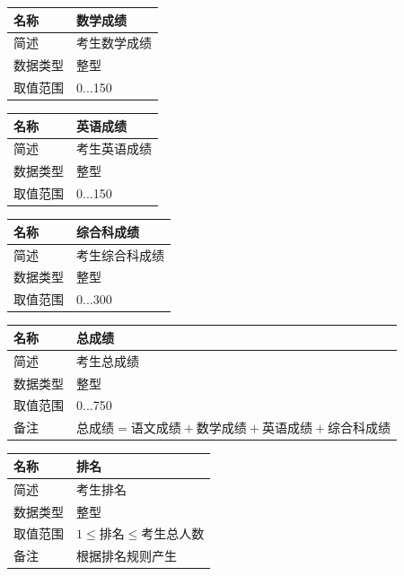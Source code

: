 \documentclass[CJK,utf8]{ctexrep}
\begin{document}
\begin{tabularx}{0.85\textwidth}{|l|X|}
	\hline
	\textbf{名称} & \textbf{数学成绩} \\
	\hline
	简述 & 考生数学成绩 \\
	\hline
	数据类型 & 整型 \\
	\hline
	取值范围 & 0...150 \\
	\hline
\end{tabularx}

\begin{tabularx}{0.85\textwidth}{|l|X|}
	\hline
	\textbf{名称} & \textbf{英语成绩} \\
	\hline
	简述 & 考生英语成绩 \\
	\hline
	数据类型 & 整型 \\
	\hline
	取值范围 & 0...150 \\
	\hline
\end{tabularx}

\begin{tabularx}{0.85\textwidth}{|l|X|}
	\hline
	\textbf{名称} & \textbf{综合科成绩} \\
	\hline
	简述 & 考生综合科成绩 \\
	\hline
	数据类型 & 整型 \\
	\hline
	取值范围 & 0...300 \\
	\hline
\end{tabularx}

\begin{tabularx}{0.85\textwidth}{|l|X|}
	\hline
	\textbf{名称} & \textbf{总成绩} \\
	\hline
	简述 & 考生总成绩 \\
	\hline
	数据类型 & 整型 \\
	\hline
	取值范围 & 0...750 \\
	\hline
	\multirow{2}{*}{备注} & $\text{总成绩}=\text{语文成绩}+\text{数学成绩}
	+\text{英语成绩}+\text{综合科成绩}$ \\
	\hline
\end{tabularx}

\begin{tabularx}{0.85\textwidth}{|l|X|}
	\hline
	\textbf{名称} & \textbf{排名} \\
	\hline
	简述 & 考生排名 \\
	\hline
	数据类型 & 整型 \\
	\hline
	取值范围 & $1\le \text{排名} \le \text{考生总人数}$\\
	\hline
	备注 & 根据排名规则产生 \\
	\hline
\end{tabularx}
\end{document}
